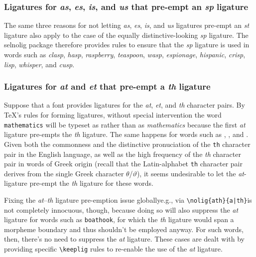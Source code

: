 \documentclass[11pt]{article}
\newcommand{\pkg}[1]{\textsf{#1}}
\newcommand{\opt}[1]{\texttt{#1}}
\newcommand{\cmmd}[1]{\texttt{\textbackslash #1}}
\begin{document}
\subsubsection*{Ligatures for \emph{as}, \emph{\ebg es}, \emph{is}, and \emph{us} that pre-empt an \emph{sp} ligature}

The same three reasons for not letting \emph{as}, \emph{\ebg es}, \emph{is}, and \emph{us} ligatures pre-empt an \emph{st} ligature also apply to the case of the equally distinctive-looking \emph{sp} ligature. The \pkg{selnolig} package therefore provides rules to ensure that the \emph{sp} ligature is used in words such as \emph{clasp}, \emph{hasp}, \emph{raspberry}, \emph{teaspoon}, \emph{wasp}, \emph{\ebg espionage}, \emph{hispanic}, \emph{crisp}, \emph{lisp}, \emph{whisper}, and \emph{cusp}. 



\subsubsection*{Ligatures for \emph{at} and \emph{et} that pre-empt a \emph{th} ligature}

Suppose that a font provides ligatures for the \emph{at}, \emph{et}, and \emph{th} character pairs. By \TeX's rules for forming ligatures, without special intervention the word \opt{mathematics} will be typeset as \emph{} rather than as \emph{mathematics} because the first \emph{at} ligature pre-empts the \emph{th} ligature. The same happens for words such as \emph{}, \emph{}, and \emph{}.
Given both the commonness and the distinctive pronuciation of the \opt{th} character pair in the English language, as well as the high frequency of the \emph{th} character pair in words of Greek origin (recall that the Latin-alphabet \opt{th} character pair derives from the single Greek character $\theta$/$\vartheta$), it seems undesirable to let the \emph{at}-ligature pre-empt the \emph{th} ligature for these words. 

Fixing the \emph{at}--\emph{th} ligature pre-emption issue globally\textemdash e.g., via \Verb+\nolig{ath}{a|th}+\textemdash is not completely innocuous, though, because doing so will also suppress the \emph{at} ligature for words such as \opt{boathook}, for which the \emph{th} ligature would span a morpheme boundary and thus shouldn't be employed anyway. For such words, then, there's no need to suppress the \emph{at} ligature. These cases are dealt with by providing specific \cmmd{keeplig} rules to re-enable the use of the \emph{at} ligature.
\end{document}
